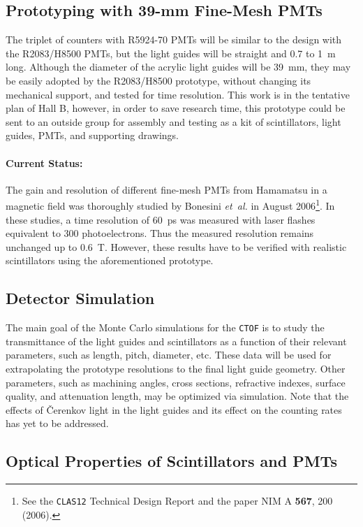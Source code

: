 \documentclass[12pt]{article}
\begin{document}
\subsection{Prototyping with 39-mm Fine-Mesh PMTs} 

The triplet of counters with R5924-70 PMTs will be similar to the design 
with the R2083/H8500 PMTs, but the light guides will be straight and 
0.7 to 1~m long.  Although the diameter of the acrylic light guides will be  
39~mm, they may be easily adopted by the R2083/H8500 prototype, without 
changing its mechanical support, and tested for time resolution.  This work  
is in the tentative plan of Hall B, however, in order to save research time,  
this prototype could be sent to an outside group for assembly and testing 
as a kit of scintillators, light guides, PMTs, and supporting drawings.

\paragraph{Current Status:} The gain and resolution of different fine-mesh 
PMTs from Hamamatsu in a magnetic field was thoroughly studied by Bonesini 
{\it et~al.} in August 2006\footnote{See the {\tt CLAS12} Technical Design 
Report and the paper NIM A {\bf 567}, 200 (2006).}.  In these studies, a time
resolution of 60~ps was measured with laser flashes equivalent to 300 
photoelectrons.  Thus the measured resolution remains unchanged up to 0.6~T.
However, these results have to be verified with realistic scintillators 
using the aforementioned prototype. 

\subsection{Detector Simulation}
  
The main goal of the Monte Carlo simulations for the {\tt CTOF} is to study 
the transmittance of the light guides and scintillators as a function of 
their relevant parameters, such as length, pitch, diameter, etc.  These data 
will be used for extrapolating the prototype resolutions to the final light 
guide geometry.  Other parameters, such as machining angles, cross sections, 
refractive indexes, surface quality, and attenuation length, may be optimized 
via simulation.  Note that the effects of {\v C}erenkov light in the light 
guides and its effect on the counting rates has yet to be addressed.

\subsection{Optical Properties of Scintillators and PMTs}
 
\end{document}
